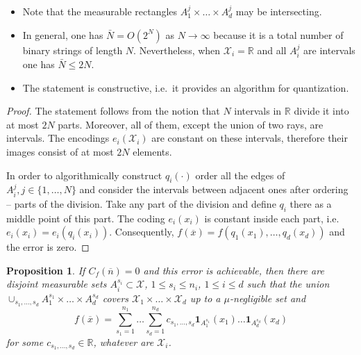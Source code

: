 \documentclass{amsart}
\newtheorem{proposition}[theorem]{Proposition}
\theoremstyle{remark}
\numberwithin{equation}{section}
\numberwithin{figure}{section}
\newcommand{\R}{\mathbb{R}}
\def\mX{\mathcal{X}}
\def\v{\overline}
\begin{document}
\begin{itemize}
	\item Note that the measurable rectangles $A_1^j\times \ldots \times A_d^j$ may be intersecting.
	\item In general, one has $\bar N= O(2^N)$ as $N\to \infty$ because it is a total number of binary strings of length $N$. Nevertheless, when $\mathcal{X}_i=\R$ and all $A_i^j$ are intervals
	one has $\bar N \leq 2N$.
	\item The statement is constructive, i.e.\ it provides an algorithm for quantization.	
\end{itemize}

\begin{proof}
	The statement follows from the notion that $N$ intervals in $\R$ divide it into at most $2N$ parts. Moreover, all of them, except the union of two rays, are intervals. The encodings $e_i(\mX_i)$ are constant on these intervals, therefore their images consist of at most $2N$ elements. 
	
	In order to algorithmically construct $q_i(\cdot)$ order all the edges of $A_i^j, j\in \{1, \ldots, N\}$ and consider the intervals between adjacent ones after ordering -- parts of the division. Take any part of the division and define $q_i$ there as a middle point of this part. The coding $e_i(x_i)$ is constant inside each part, i.e. $e_i(x_i) = e_i(q_i(x_i))$. Consequently, $f(\v x) = f(q_1(x_1),\ldots, q_d(x_d))$ and the error is zero.

\end{proof}	

\begin{proposition}\label{prop_zerocost1}
	If 
	$C_f(\v n)=0$ and this error is achievable, then there are disjoint measurable sets $A_i^{s_i}\subset \mX$, $1 \leq s_i \leq n_i$, $1\leq i \leq d$ such that
	the union 
	$\cup_{s_1, \ldots, s_d} A_1^{s_1} \times \ldots \times A_d^{s_d}$ covers $\mX_1 \times \ldots \times \mX_d$ up to a $\mu$-negligible set and 
\begin{equation}\label{eq_fstep1a}
	f(\v x)=\sum_{s_1=1}^{n_1}\ldots \sum_{s_d = 1}^{n_d} c_{s_1, \ldots, s_d} \mathbf{1}_{A_1^{s_1}}(x_1)\ldots \mathbf{1}_{A_d^{s_d}}(x_d)
\end{equation}	for some $c_{s_1, \ldots, s_d}\in \R$, whatever are $\mX_i$. 
\end{proposition}
\end{document}
